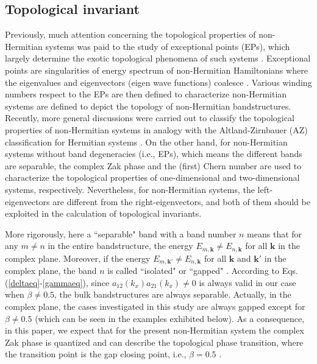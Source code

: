 \documentclass[aps,pra,reprint,groupedaddress,nofootinbib,longbibliography,showpacs]{revtex4-1}
\begin{document}
\subsection{Topological invariant}\label{topoinvariant}
Previously, much attention concerning the topological properties of non-Hermitian systems was paid to the study of exceptional points (EPs), which largely determine the exotic topological phenomena of such systems \cite{fengNaturephton2017,elganainyNaturephys2018}. Exceptional points are singularities of energy spectrum of non-Hermitian Hamiltonians where the eigenvalues and eigenvectors (eigen wave functions) coalesce \cite{heissJPA2012}. Various winding numbers respect to the EPs are then defined to characterize non-Hermitian systems \cite{leePRL2016,leykamPRL2017,yinPRA2018} are defined to depict the topology of non-Hermitian bandstructures. Recently, more general discussions were carried out to classify the topological properties of non-Hermitian systems in analogy with the Altland-Zirnbauer (AZ) classification \cite{schnyderPRB2008} for Hermitian systems \cite{gong2018topological}. On the other hand, for non-Hermitian systems without band degeneracies (i.e., EPs), which means the different bands are separable, the complex Zak phase \cite{garrisonPLA1988,liangPRA2013,lieuPRB2018,partoPRL2018,dangel2018topological} and the (first) Chern number \cite{shenPRL2018,kawabata2018nonhermitian} are used to characterize the topological properties of one-dimensional and two-dimensional systems, respectively. Nevertheless, for non-Hermitian systems, the left-eigenvectors are different from the right-eigenvectors, and both of them should be exploited in the calculation of topological invariants. 	
	
More rigorously, here a ``separable" band with a band number $n$ means that for any $m\neq n$ in the entire bandstructure, the energy $E_{m,\mathbf{k}}\neq E_{n,\mathbf{k}}$ for all $\mathbf{k}$ in the complex plane. Moreover, if the energy $E_{m,\mathbf{k}'}\neq E_{n,\mathbf{k}}$ for all $\mathbf{k}$ and $\mathbf{k}'$ in the complex plane, the band $n$ is called ``isolated" or ``gapped" \cite{shenPRL2018}. According to Eqs.(\ref{deltaeq}-\ref{gammaeq}), since $a_{12}(k_x)a_{21}(k_x)\neq0$ is always valid in our case when $\beta\neq0.5$, the bulk bandstructures are always separable. Actually, in the complex plane, the cases investigated in this study are always gapped except for  $\beta\neq0.5$ (which can be seen in the examples exhibited below). As a consequence, in this paper, we expect that for the present non-Hermitian system the complex Zak phase is quantized and can describe the topological phase transition, where the transition point is the gap closing point, i.e., $\beta=0.5$ \cite{lieuPRB2018}. 
\end{document}
